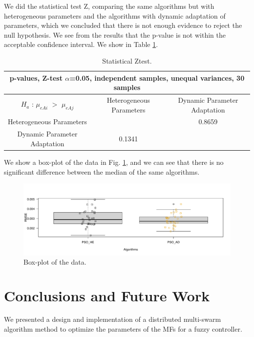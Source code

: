 \documentclass[runningheads]{llncs}
\begin{document}
We did the statistical test Z, comparing the same algorithms but with heterogeneous parameters and the algorithms with dynamic adaptation of parameters, which we concluded that there is not enough evidence to reject the null hypothesis.
We see from the results that the p-value is not within the acceptable confidence interval. We show in Table \ref{tab:ztest}.

 \begin{table}[ht]
  \caption{Statistical Ztest.}
  \label{tab:ztest}
  \centering
  \setlength{\tabcolsep}{8pt}
  \begin{tabular}{|c|c|c|}    \hline
    \multicolumn{3}{|c|}{  p-values,  Z-test $\alpha$=0.05,  independent samples,  unequal variances,  30 samples  }  \\ [1ex] \hline
    $H_a$ : $\mu_{eAi}$ $>$ $\mu_{eAj}$ &  Heterogeneous Parameters      & Dynamic Parameter Adaptation  \\   \hline
         Heterogeneous Parameters     &     & 0.8659\cellcolor{lightgray}  \\  \hline
         Dynamic Parameter Adaptation     &   0.1341\cellcolor{lightgray}  & \\ \hline    
 \end{tabular}
 \end{table}

We show a box-plot of the data in Fig. \ref{fig:boxplot}, and we can see that
there is no significant difference between the median of the same algorithms.

\begin{figure}[ht]
  \centering
  \includegraphics[angle=0,width=1\textwidth]{RplotAjusteParam.pdf}
  \caption{Box-plot of the data.}
  \label{fig:boxplot} 
\end{figure}

\section{Conclusions and Future Work}\label{sec:conclusions}

We presented a design and implementation of a distributed multi-swarm algorithm method to optimize the parameters of the MFs for a fuzzy controller.
\end{document}
